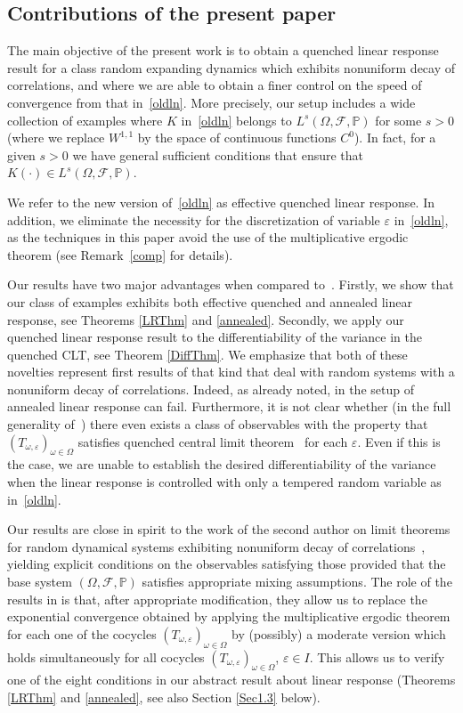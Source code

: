 \documentclass[11pt,reqno,a4paper]{article}
\theoremstyle{special}
\def\om{\omega}
\begin{document}
\subsection{Contributions of the present paper}
The main objective of the present work is to obtain a quenched linear response result for a class random expanding dynamics which exhibits nonuniform decay of correlations, and where we are able to obtain a finer control on the speed of convergence from that in~\eqref{oldln}. More precisely, our setup includes a wide collection of examples where $K$ in~\eqref{oldln} belongs to $L^s(\Omega, \mathcal F, \mathbb P)$ for some $s>0$ (where we replace $W^{1, 1}$ by the space of continuous functions $C^0$). In fact, for a given $s>0$ we have general sufficient conditions that ensure that $K(\cdot)\in L^s(\Omega, \mathcal F, \mathbb P)$. 

We refer to the new version of~\eqref{oldln} as  effective quenched linear response.
In addition, we eliminate the necessity for the discretization of variable $\varepsilon$ in~\eqref{oldln}, as the techniques in this paper avoid the use of the multiplicative ergodic theorem (see Remark~\ref{comp} for details).

Our results have two major advantages when compared to~\cite{DGS}. Firstly, we show that our class of examples exhibits  both effective quenched and annealed linear response,  see Theorems \ref{LRThm} and \ref{annealed}. Secondly, we apply our quenched linear response result to the differentiability of the variance in the quenched CLT, see Theorem \ref{DiffThm}.
We emphasize that  both of these novelties represent first results of that kind that deal with random systems with a nonuniform decay of correlations. Indeed, as already noted, in the setup of~\cite{DGS} annealed linear response can fail. Furthermore, it is not clear  whether (in the full generality of~\cite{DGS}) there even exists a class of observables with the property that $(T_{\om, \varepsilon})_{\om \in \Omega}$ satisfies quenched central limit theorem~\cite{DHS, DS1} for each $\varepsilon$. Even if this is the case, we are unable to establish the desired differentiability of the variance when the linear response is controlled with only a tempered random variable as in~\eqref{oldln}.

Our results are close in spirit to the work of the second author on limit theorems for random dynamical systems exhibiting nonuniform decay of correlations~\cite{YHAdv, YH 23}, yielding explicit conditions on the observables satisfying those  provided that the base system $(\Omega, \mathcal F, \mathbb P)$ satisfies appropriate mixing assumptions. The role of the results in \cite{YHAdv, YH 23} is that, after appropriate modification, they allow us to replace the exponential convergence obtained by applying the multiplicative ergodic theorem for each one of the cocycles $(T_{\om,\varepsilon})_{\om\in\Omega}$ by (possibly) a moderate version which holds simultaneously for all   cocycles $(T_{\om,\varepsilon})_{\om\in\Omega}$, $\varepsilon\in I$.   This allows us to verify one of the eight conditions in our  abstract result about linear response (Theorems \ref{LRThm} and \ref{annealed}, see  also Section \ref{Sec1.3} below). 
\end{document}
